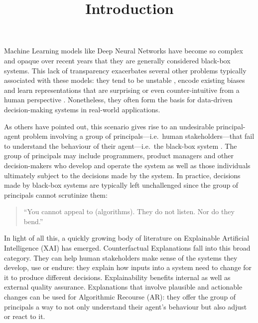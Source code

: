 \documentclass[
  letterpaper,
  DIV=11,
  numbers=noendperiod]{scrartcl}
\title{Introduction}
\author{}
\date{}
\begin{document}
\maketitle
\ifdefined\Shaded\renewenvironment{Shaded}{\begin{tcolorbox}[frame hidden, boxrule=0pt, interior hidden, breakable, borderline west={3pt}{0pt}{shadecolor}, enhanced, sharp corners]}{\end{tcolorbox}}\fi

Machine Learning models like Deep Neural Networks have become so complex
and opaque over recent years that they are generally considered
black-box systems. This lack of transparency exacerbates several other
problems typically associated with these models: they tend to be
unstable \cite{goodfellow2014explaining}, encode existing biases
\cite{buolamwini2018gender} and learn representations that are
surprising or even counter-intuitive from a human perspective
\cite{sturm2014simple}. Nonetheless, they often form the basis for
data-driven decision-making systems in real-world applications.

As others have pointed out, this scenario gives rise to an undesirable
principal-agent problem involving a group of principals---i.e.~human
stakeholders---that fail to understand the behaviour of their
agent---i.e.~the black-box system \cite{borch2022machine}. The group of
principals may include programmers, product managers and other
decision-makers who develop and operate the system as well as those
individuals ultimately subject to the decisions made by the system. In
practice, decisions made by black-box systems are typically left
unchallenged since the group of principals cannot scrutinize them:

\begin{quote}
``You cannot appeal to (algorithms). They do not listen. Nor do they
bend.'' \cite{oneil2016weapons}
\end{quote}

In light of all this, a quickly growing body of literature on
Explainable Artificial Intelligence (XAI) has emerged. Counterfactual
Explanations fall into this broad category. They can help human
stakeholders make sense of the systems they develop, use or endure: they
explain how inputs into a system need to change for it to produce
different decisions. Explainability benefits internal as well as
external quality assurance. Explanations that involve plausible and
actionable changes can be used for Algorithmic Recourse (AR): they offer
the group of principals a way to not only understand their agent's
behaviour but also adjust or react to it.
\end{document}
